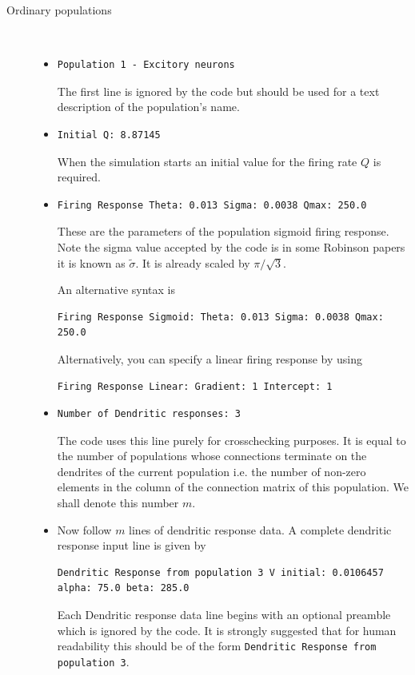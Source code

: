 \documentclass[12pt,a4paper]{article}
\begin{document}
\begin{description}
\item[Ordinary populations]\ \\

	\begin{itemize}
	\item
	\begin{lstlisting}
Population 1 - Excitory neurons
	\end{lstlisting}
	The first line is ignored by the code but should be used for a text description of the population's name.
	\item
	\begin{lstlisting}
Initial Q: 8.87145
	\end{lstlisting}
	When the simulation starts an initial value for the firing rate $Q$ is required.
	\item
	\begin{lstlisting}
Firing Response Theta: 0.013 Sigma: 0.0038 Qmax: 250.0
	\end{lstlisting}
	These are the parameters of the population sigmoid firing response. Note the sigma value accepted by the code is in some Robinson papers it is known as $\tilde{\sigma}$. It is already scaled  by $\pi / \sqrt{3}$.

	An alternative syntax is
	\begin{lstlisting}
Firing Response Sigmoid: Theta: 0.013 Sigma: 0.0038 Qmax: 250.0
	\end{lstlisting}
	Alternatively, you can specify a linear firing response by using
	\begin{lstlisting}
Firing Response Linear: Gradient: 1 Intercept: 1
	\end{lstlisting}
	\item
	\begin{lstlisting}
Number of Dendritic responses: 3
	\end{lstlisting}
	The code uses this line purely for crosschecking purposes. It is equal to the number of populations whose connections terminate on the dendrites of the current population i.e. the number of non-zero elements in the column of the connection matrix of this population. We shall denote this number $m$.
	\item Now follow $m$ lines of dendritic response data. A complete dendritic response input line is given by
	\begin{lstlisting}
Dendritic Response from population 3 V initial: 0.0106457 alpha: 75.0 beta: 285.0
	\end{lstlisting}
	Each Dendritic response data line begins with an optional preamble which is ignored by the code. It is strongly suggested that for human readability this should be of the form {\tt \small Dendritic Response from population 3}.


\end{itemize}
\end{description}
\end{document}
